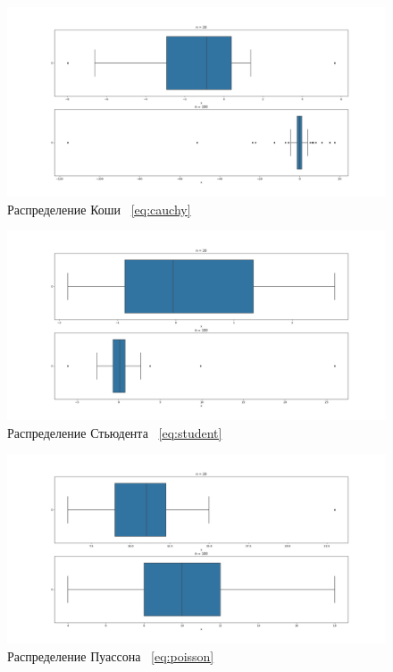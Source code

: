 \documentclass[12pt,a4paper]{article}
\begin{document}
	\begin{figure}[htbp!]
		\begin{center}
			\includegraphics[width = 1.12\linewidth]{graphics/cauchy.png}
			\caption{Распределение Коши \ \eqref{eq:cauchy}}
		\end{center}
	\end{figure}

	\newpage

	\begin{figure}[htbp!]
		\begin{center}
			\includegraphics[width = 1.12\linewidth]{graphics/student.png}
			\caption{Распределение Стьюдента \ \eqref{eq:student}}
		\end{center}
	\end{figure}

	\begin{figure}[htbp!]
		\begin{center}
			\includegraphics[width = 1.12\linewidth]{graphics/poisson.png}
			\caption{Распределение Пуассона \ \eqref{eq:poisson}}
		\end{center}
	\end{figure}
\end{document}
